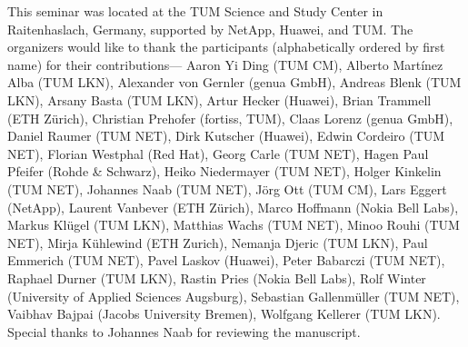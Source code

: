 This seminar was located at the TUM Science and Study Center in Raitenhaslach,
Germany, supported by NetApp, Huawei, and TUM\@.  The organizers would like to
thank the participants (alphabetically ordered by first name) for their
contributions---%
Aaron Yi Ding (TUM CM),
Alberto Martínez Alba (TUM LKN),
Alexander von Gernler (genua GmbH),
Andreas Blenk (TUM LKN),
Arsany Basta (TUM LKN),
Artur Hecker (Huawei),
Brian Trammell (ETH Zürich),
Christian Prehofer (fortiss, TUM),
Claas Lorenz (genua GmbH),
Daniel Raumer (TUM NET),
Dirk Kutscher (Huawei),
Edwin Cordeiro (TUM NET),
Florian Westphal (Red Hat),
Georg Carle (TUM NET),
Hagen Paul Pfeifer (Rohde \& Schwarz),
Heiko Niedermayer (TUM NET),
Holger Kinkelin (TUM NET),
Johannes Naab (TUM NET),
Jörg Ott (TUM CM),
Lars Eggert (NetApp),
Laurent Vanbever (ETH Zürich),
Marco Hoffmann (Nokia Bell Labs),
Markus Klügel (TUM LKN),
Matthias Wachs (TUM NET),
Minoo Rouhi (TUM NET),
Mirja Kühlewind (ETH Zurich),
Nemanja Djeric (TUM LKN),
Paul Emmerich (TUM NET),
Pavel Laskov (Huawei),
Peter Babarczi (TUM NET),
Raphael Durner (TUM LKN),
Rastin Pries (Nokia Bell Labs),
Rolf Winter (University of Applied Sciences Augsburg),
Sebastian Gallenmüller (TUM NET),
Vaibhav Bajpai (Jacobs University Bremen),
Wolfgang Kellerer (TUM LKN).
Special thanks to Johannes Naab for reviewing the manuscript.

